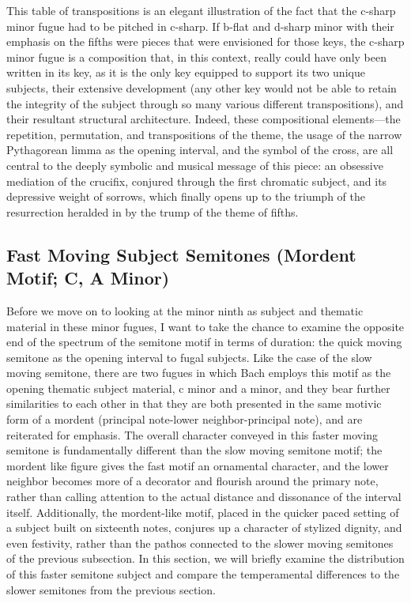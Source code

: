 This table of transpositions is an elegant illustration of the fact that
the c-sharp minor fugue had to be pitched in c-sharp. If b-flat and
d-sharp minor with their emphasis on the fifths were pieces that were
envisioned for those keys, the c-sharp minor fugue is a composition
that, in this context, really could have only been written in its key,
as it is the only key equipped to support its two unique subjects, their
extensive development (any other key would not be able to retain the
integrity of the subject through so many various different
transpositions), and their resultant structural architecture. Indeed,
these compositional elements---the repetition, permutation, and
transpositions of the theme, the usage of the narrow Pythagorean limma
as the opening interval, and the symbol of the cross, are all central to
the deeply symbolic and musical message of this piece: an obsessive
mediation of the crucifix, conjured through the first chromatic subject,
and its depressive weight of sorrows, which finally opens up to the
triumph of the resurrection heralded in by the trump of the theme of
fifths.

    \subsection{Fast Moving Subject Semitones (Mordent Motif; C, A
Minor)}\label{fast-moving-subject-semitones-mordent-motif-c-a-minor}

Before we move on to looking at the minor ninth as subject and thematic
material in these minor fugues, I want to take the chance to examine the
opposite end of the spectrum of the semitone motif in terms of duration:
the quick moving semitone as the opening interval to fugal subjects.
Like the case of the slow moving semitone, there are two fugues in which
Bach employs this motif as the opening thematic subject material, c
minor and a minor, and they bear further similarities to each other in
that they are both presented in the same motivic form of a mordent
(principal note-lower neighbor-principal note), and are reiterated for
emphasis. The overall character conveyed in this faster moving semitone
is fundamentally different than the slow moving semitone motif; the
mordent like figure gives the fast motif an ornamental character, and
the lower neighbor becomes more of a decorator and flourish around the
primary note, rather than calling attention to the actual distance and
dissonance of the interval itself. Additionally, the mordent-like motif,
placed in the quicker paced setting of a subject built on sixteenth
notes, conjures up a character of stylized dignity, and even festivity,
rather than the pathos connected to the slower moving semitones of the
previous subsection. In this section, we will briefly examine the
distribution of this faster semitone subject and compare the
temperamental differences to the slower semitones from the previous
section.

